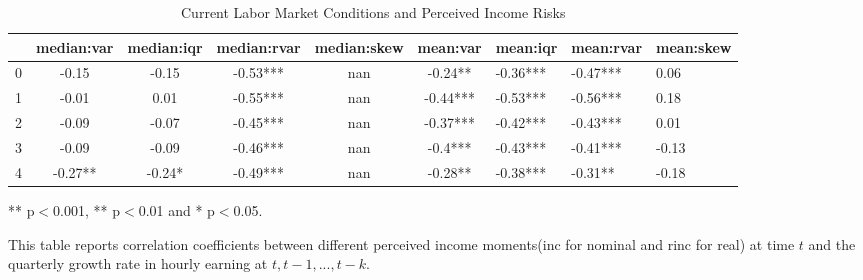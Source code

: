\begin{table}[ht]
\centering
\begin{adjustbox}{width={\textwidth}}
\begin{threeparttable}
\caption{Current Labor Market Conditions and Perceived Income Risks}
\label{macro_corr_he}
\begin{tabular}{cccccclll}
\toprule
{} & median:var & median:iqr & median:rvar & median:skew &  mean:var &  mean:iqr & mean:rvar & mean:skew \\
\midrule
0 &      -0.15 &      -0.15 &    -0.53*** &         nan &   -0.24** &  -0.36*** &  -0.47*** &      0.06 \\
1 &      -0.01 &       0.01 &    -0.55*** &         nan &  -0.44*** &  -0.53*** &  -0.56*** &      0.18 \\
2 &      -0.09 &      -0.07 &    -0.45*** &         nan &  -0.37*** &  -0.42*** &  -0.43*** &      0.01 \\
3 &      -0.09 &      -0.09 &    -0.46*** &         nan &   -0.4*** &  -0.43*** &  -0.41*** &     -0.13 \\
4 &    -0.27** &     -0.24* &    -0.49*** &         nan &   -0.28** &  -0.38*** &   -0.31** &     -0.18 \\
\bottomrule
\end{tabular}
\begin{tablenotes}
\item *** p$<$0.001, ** p$<$0.01 and * p$<$0.05.
\item This table reports correlation coefficients between different perceived income moments(inc for nominal
and rinc for real) at time
$t$ and the quarterly growth rate in hourly earning at $t,t-1,...,t-k$.
\end{tablenotes}
\end{threeparttable}
\end{adjustbox}
\end{table}
